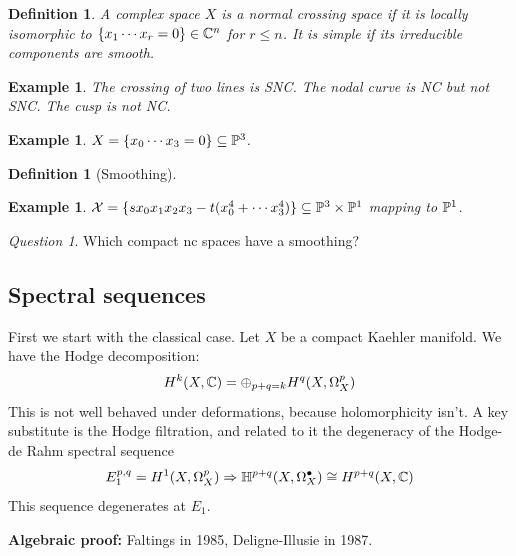 \documentclass[A4paper, british]{amsart}
\theoremstyle{darkgreentheorem}
\theoremstyle{darkbluedefinition}
\newtheorem{defn}[thm]{Definition}
\theoremstyle{darkredexample}
\newtheorem{exa}[thm]{Example}
\theoremstyle{remark}
\newtheorem{q}[thm]{Question}
\newcommand{\1}{\mathbbm{1}}
\newcommand{\op}{\oplus}
\newcommand{\grd}{^{\bullet}}
\newcommand{\sub}{\subseteq}
\begin{document}
\begin{defn}
    A complex space $X$ is a \textit{normal crossing} space if it is locally isomorphic to $\{x_{1}\cdots x_{r}=0\}\in \C^{n}$ for $r\leqslant n$.
    It is \textit{simple} if its irreducible components are smooth.
\end{defn}

\begin{exa}
    The crossing of two lines is SNC.
    The nodal curve is NC but not SNC.
    The cusp is not NC.
\end{exa}

\begin{exa}
    $X=\{x_{0}\cdots x_{3}=0\}\sub \P^{3}$.
\end{exa}

\begin{defn}[Smoothing]
    \begin{center}
    \end{center}
\end{defn}

\begin{exa}
    $\X=\{sx_{0}x_{1}x_{2}x_{3}-t(x_{0}^{4}+\cdots x_{3}^{4}) \}\sub \P^{3}\times \P^{1}$ mapping to $\P^{1}$.
\end{exa}

\begin{q}
    Which compact nc spaces have a smoothing?
\end{q}

\subsection{Spectral sequences}

First we start with the classical case.
Let $X$ be a compact Kaehler manifold.
We have the Hodge decomposition:
\[ H^{k}(X,\C)=\op_{p+q=k}H^{q}(X,\Omega_{X}^{p}) \]
This is not well behaved under deformations, because holomorphicity isn't.
A key substitute is the Hodge filtration, and related to it the degeneracy of the Hodge-de Rahm spectral sequence
\[ E_{1}^{p,q}=H^{1}(X,\Omega_{X}^{p})\Rightarrow \bbH^{p+q}(X,\Omega_{X}\grd)\cong H^{p+q}(X,\C) \]
This sequence degenerates at $E_{1}$.

\textbf{Algebraic proof:} Faltings in 1985, Deligne-Illusie in 1987.
\end{document}
